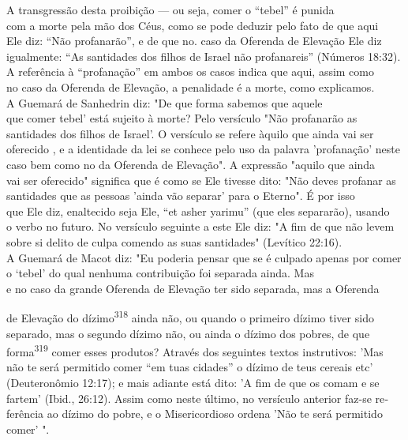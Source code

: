 A transgressão desta proibição --- ou seja, comer o ``tebel'' é punida\\
com a morte pela mão dos Céus, como se pode deduzir pelo fato de que
aqui\\
Ele diz: ``Não profanarão'', e de que no. caso da Oferenda de Elevação Ele
diz\\
igualmente: ``As santidades dos filhos de Israel não profanareis''
(Números 18:32).\\
A referência à ``profanação'' em ambos os casos indica que aqui, assim
como\\
no caso da Oferenda de Elevação, a penalidade é a morte, como
explicamos.\\
A Guemará de Sanhedrin diz: "De que forma sabemos que aquele\\
que comer tebel' está sujeito à morte? Pelo versículo "Não profanarão as
santidades
dos filhos de Israel'. O versículo se refere àquilo que ainda vai
ser oferecido
, e a identidade da lei se conhece pelo uso da palavra 'profanação'
neste\\
caso bem como no da Oferenda de Elevação". A expressão "aquilo que
ainda\\
vai ser oferecido" significa que é como se Ele tivesse dito: "Não deves
profanar
as santidades que as pessoas 'ainda vão separar' para o Eterno". É
por isso\\
que Ele diz, enaltecido seja Ele, ``et asher yarimu'' (que eles
separarão), usando\\
o verbo no futuro. No versículo seguinte a este Ele diz: "A fim de que
não levem
sobre si delito de culpa comendo as suas santidades" (Levítico
22:16).\\
A Guemará de Macot diz: "Eu poderia pensar que se é culpado apenas
por comer o `tebel' do qual nenhuma contribuição foi separada ainda.
Mas\\
e no caso da grande Oferenda de Elevação ter sido separada, mas a
Oferenda



de Elevação do dízimo\textsuperscript{318} ainda não, ou quando o
primeiro dízimo tiver sido separado, mas o segundo dízimo não, ou ainda
o dízimo dos pobres, de que forma\textsuperscript{319} comer esses
produtos? Através dos seguintes textos instrutivos: 'Mas não te será
permitido comer ``em tuas cidades'' o dízimo de teus cereais etc'
(Deuteronômio 12:17); e mais adiante está dito: 'A fim de que os comam e
se fartem' (Ibid., 26:12). Assim como neste último, no versículo
anterior faz-se re­ferência ao dízimo do pobre, e o Misericordioso
ordena 'Não te será permitido comer' ".

